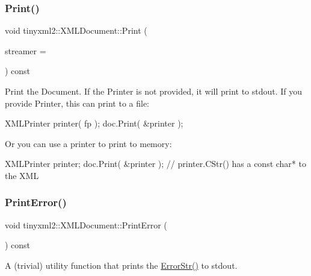 \subsubsection{\texorpdfstring{Print()}{Print()}}
{\footnotesize\ttfamily void tinyxml2\+::\+X\+M\+L\+Document\+::\+Print (\begin{DoxyParamCaption}\item[{\mbox{\hyperlink{classtinyxml2_1_1_x_m_l_printer}{X\+M\+L\+Printer}} $\ast$}]{streamer = {} }\end{DoxyParamCaption}) const}

Print the Document. If the Printer is not provided, it will print to stdout. If you provide Printer, this can print to a file\+: \begin{DoxyVerb}XMLPrinter printer( fp );
doc.Print( &printer );
\end{DoxyVerb}


Or you can use a printer to print to memory\+: \begin{DoxyVerb}XMLPrinter printer;
doc.Print( &printer );
// printer.CStr() has a const char* to the XML
\end{DoxyVerb}
 \mbox{\label{classtinyxml2_1_1_x_m_l_document_a1d033945b42e125d933d6231e4571552}} 
\subsubsection{\texorpdfstring{Print\+Error()}{PrintError()}}
{\footnotesize\ttfamily void tinyxml2\+::\+X\+M\+L\+Document\+::\+Print\+Error (\begin{DoxyParamCaption}{ }\end{DoxyParamCaption}) const}



A (trivial) utility function that prints the \mbox{\hyperlink{classtinyxml2_1_1_x_m_l_document_ae97fff2402a0d01e0509c430b37996b3}{Error\+Str()}} to stdout. 

\mbox{\label{classtinyxml2_1_1_x_m_l_document_a53e6c035b1b539563fef8c817fb30469}} 
